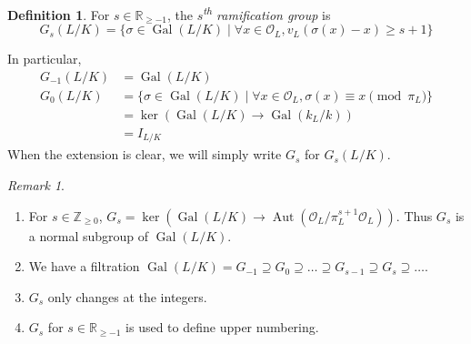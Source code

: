 \documentclass[11pt]{article}
\theoremstyle{definition}
\newtheorem{definition}{Definition}[subsection]
\theoremstyle{plain}
\theoremstyle{remark}
\newtheorem*{remark}{Remark}
\DeclareMathOperator{\Gal}{Gal}
\DeclareMathOperator{\Aut}{Aut}
\newcommand{\ZZ}{\mathbb{Z}}
\newcommand{\RR}{\mathbb{R}}
\newcommand{\cO}{\mathcal{O}}
\begin{document}
\begin{definition}\label{def:14_1}
    For $s \in \RR_{\ge -1}$, the \emph{$s$\textsuperscript{th} ramification group} is
    \begin{equation*}
        G_s(L / K) = \{\sigma \in \Gal(L/K) \mid \forall x \in \cO_L, v_L(\sigma(x) - x) \ge s + 1\}
    \end{equation*}
\end{definition}
\noindent In particular,
\begin{align*}
    G_{-1}(L/K) &= \Gal(L/K)\\
    G_0(L/K)
    &= \{\sigma \in \Gal(L/K) \mid \forall x \in \cO_L, \sigma(x) \equiv x \pmod{\pi_L}\}\\
    &= \ker(\Gal(L/K) \to \Gal(k_L/k))\\
    &= I_{L/K}
\end{align*}
When the extension is clear, we will simply write $G_s$ for $G_s(L/K)$.

\begin{remark}\phantom{}
    \begin{enumerate}
        \item For $s \in \ZZ_{\ge 0}$, $G_s = \ker(\Gal(L/K) \to \Aut(\cO_L / \pi_L^{s+1} \cO_L))$. Thus $G_s$ is a normal subgroup of $\Gal(L/K)$.
        \item We have a filtration $\Gal(L/K) = G_{-1} \supseteq G_0 \supseteq \ldots \supseteq G_{s-1} \supseteq G_s \supseteq \ldots$.
        \item $G_s$ only changes at the integers.
        \item $G_s$ for $s \in \RR_{\ge -1}$ is used to define upper numbering.
    \end{enumerate}
\end{remark}
\end{document}
